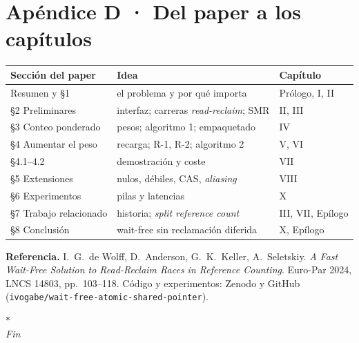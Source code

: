 \chapter{Apéndice D · Del paper a los capítulos}

{\small
\begin{tabularx}{\textwidth}{@{}l X l@{}}
\toprule
\textbf{Sección del paper} & \textbf{Idea} & \textbf{Capítulo} \\
\midrule
Resumen y §1 & el problema y por qué importa & Prólogo, I, II \\
§2 Preliminares & interfaz; carreras \emph{read-reclaim}; SMR & II, III \\
§3 Conteo ponderado & pesos; algoritmo 1; empaquetado & IV \\
§4 Aumentar el peso & recarga; R-1, R-2; algoritmo 2 & V, VI \\
§4.1--4.2 & demostración y coste & VII \\
§5 Extensiones & nulos, débiles, CAS, \emph{aliasing} & VIII \\
§6 Experimentos & pilas y latencias & X \\
§7 Trabajo relacionado & historia; \emph{split reference count} & III, VII, Epílogo \\
§8 Conclusión & wait-free sin reclamación diferida & X, Epílogo \\
\bottomrule
\end{tabularx}
}

\medskip
\noindent\textbf{Referencia.} I.~G.~de Wolff, D.~Anderson, G.~K.~Keller, A.~Seletskiy. \emph{A Fast Wait-Free Solution to Read-Reclaim Races in Reference Counting}. Euro-Par 2024, LNCS 14803, pp.~103--118. Código y experimentos: Zenodo y GitHub (\texttt{ivogabe/wait-free-atomic-shared-pointer}).

\vfill
\begin{center}
{\color{oxido}$\ast$}\\[2mm]
{\small\itshape Fin}
\end{center}
